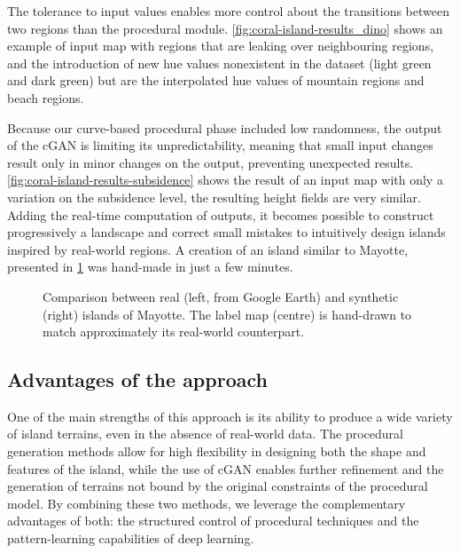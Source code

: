 The tolerance to input values enables more control about the transitions between two regions than the procedural module. \cref{fig:coral-island-results_dino} shows an example of input map with regions that are leaking over neighbouring regions, and the introduction of new hue values nonexistent in the dataset (light green and dark green) but are the interpolated hue values of mountain regions and beach regions.

Because our curve-based procedural phase included low randomness, the output of the cGAN is limiting its unpredictability, meaning that small input changes result only in minor changes on the output, preventing unexpected results. \cref{fig:coral-island-results-subsidence} shows the result of an input map with only a variation on the subsidence level, the resulting height fields are very similar. Adding the real-time computation of outputs, it becomes possible to construct progressively a landscape and correct small mistakes to intuitively design islands inspired by real-world regions. A creation of an island similar to Mayotte, presented in \cref{fig:coral-island-example-Mayotte} was hand-made in just a few minutes.

\begin{figure}
    \caption[Comparison of  the cGAN output with Mayotte Island]{Comparison between real (left, from Google Earth) and synthetic (right) islands of Mayotte. The label map (centre) is hand-drawn to match approximately its real-world counterpart.}
    \label{fig:coral-island-example-Mayotte}
\end{figure}




\subsection{Advantages of the approach}
\label{sec:coral-island-advantages}

One of the main strengths of this approach is its ability to produce a wide variety of island terrains, even in the absence of real-world data. The procedural generation methods allow for high flexibility in designing both the shape and features of the island, while the use of cGAN enables further refinement and the generation of terrains not bound by the original constraints of the procedural model. By combining these two methods, we leverage the complementary advantages of both: the structured control of procedural techniques and the pattern-learning capabilities of deep learning.


